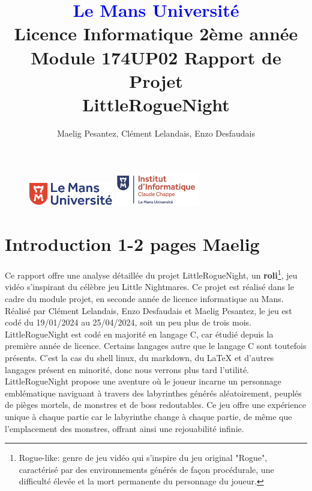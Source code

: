 \documentclass[10pt]{article}
\begin{document}
\begin{figure}
\includegraphics[width=3.7cm]{logolemansU.png}
\hspace{160pt}
\includegraphics[width=3.7cm]{logo_IC2.png}
\end{figure}

\title{\textbf{\textcolor{blue}{Le Mans Université}}\\Licence Informatique 2ème année\\Module 174UP02 Rapport de Projet\\\textbf{LittleRogueNight}}
\author{Maelig Pesantez, Clément Lelandais, Enzo Desfaudais}
\maketitle

\newpage
\tableofcontents

\newpage

\section{Introduction 1-2 pages Maelig}
Ce rapport offre une analyse détaillée du projet LittleRogueNight, un \textbf{\gls{roli}}\footnote{Rogue-like: genre de jeu vidéo qui s'inspire du jeu original 
"Rogue", caractérisé par des environnements générés de façon procédurale, une difficulté élevée et la mort permanente du personnage du joueur.}, 
jeu vidéo s'inspirant du célèbre jeu Little Nightmares. 
Ce projet est réalisé dans le cadre du module projet, en seconde année de licence informatique au Mans.
Réalisé par Clément Lelandais, Enzo Desfaudais et Maelig Pesantez, le jeu est codé du 19/01/2024 au 25/04/2024, soit un peu plus de trois mois.
LittleRogueNight est codé en majorité en langage C, car étudié depuis la première année de licence. Certains langages autre que le langage C sont toutefois présents.
C'est la cas du shell linux, du markdown, du LaTeX et d'autres langages présent en minorité, donc nous verrons plus tard l'utilité.
LittleRogueNight propose une aventure où le joueur incarne un personnage emblématique naviguant à travers des labyrinthes générés aléatoirement, 
peuplés de pièges mortels, de monstres et de boss redoutables. 
Ce jeu offre une expérience unique à chaque partie car le labyrinthe change à chaque partie, de même que l'emplacement des monstres, offrant ainsi une rejouabilité infinie.\\
\end{document}
